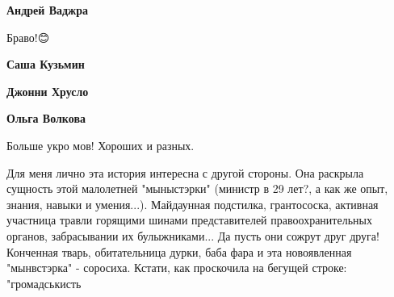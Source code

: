 \begin{itemize}
\textbf{Андрей Ваджра}

 
Браво!😊

 
\textbf{Саша Кузьмин}

 
\textbf{Джонни Хрусло}

 
\textbf{Ольга Волкова}

 
Больше укро мов! Хороших и разных.

 

Для меня лично эта история интересна с другой стороны. Она раскрыла сущность
этой малолетней "мыныстэрки" (министр в 29 лет?, а как же опыт, знания, навыки
и умения...). Майдаунная подстилка, грантососка, активная участница травли
горящими шинами представителей правоохранительных органов, забрасывании их
булыжниками... Да пусть они сожрут друг друга! Конченная тварь, обитательница
дурки, баба фара и эта новоявленная "мынвстэрка" - соросиха. Кстати, как
проскочила на бегущей строке: "громадськисть


\end{itemize}
